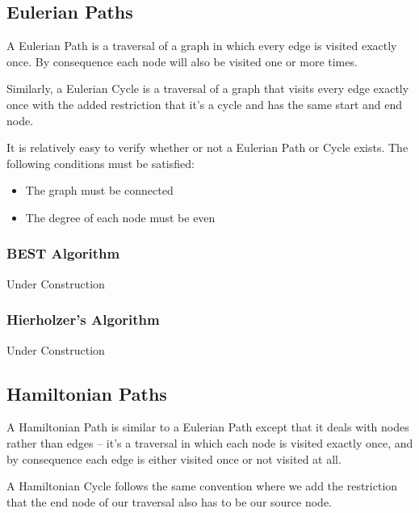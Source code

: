 \subsection{Eulerian Paths}
 

A Eulerian Path is a traversal of a graph in which every edge is visited exactly once. By consequence each node will also be visited one or more times.

Similarly, a Eulerian Cycle is a traversal of a graph that visits every edge exactly once with the added restriction that it's a cycle and has the same start and end node.

It is relatively easy to verify whether or not a Eulerian Path or Cycle exists. The following conditions must be satisfied:
\begin{itemize}
\item The graph must be connected
\item The degree of each node must be even
\end{itemize}

\subsubsection{BEST Algorithm}

Under Construction

\subsubsection{Hierholzer's Algorithm}

Under Construction

\subsection{Hamiltonian Paths}
 

A Hamiltonian Path is similar to a Eulerian Path except that it deals with nodes rather than edges -- it's a traversal in which each node is visited exactly once, and by consequence each edge is either visited once or not visited at all.

A Hamiltonian Cycle follows the same convention where we add the restriction that the end node of our traversal also has to be our source node.

